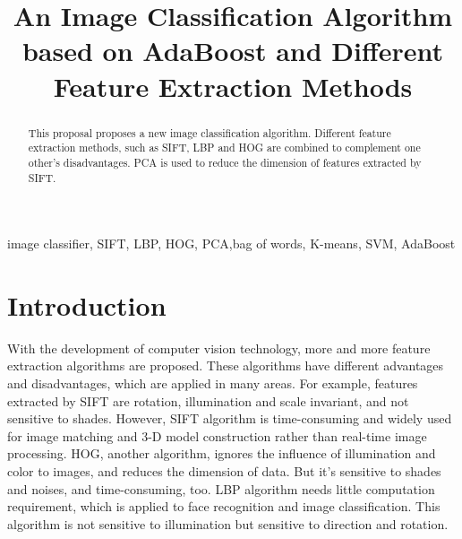\documentclass[conference]{IEEEtran}
\begin{document}
\title{An Image Classification Algorithm based on AdaBoost and Different Feature Extraction Methods\\
}

\author{
\and
{}
}

\maketitle

\begin{abstract}
This proposal proposes a new image classification algorithm. Different feature extraction methods, such as SIFT, LBP and HOG are combined to complement one other's disadvantages. PCA is used to reduce the dimension of features extracted by SIFT. 
\end{abstract}

\begin{IEEEkeywords}
image classifier, SIFT, LBP, HOG, PCA,bag of words, K-means, SVM, AdaBoost 
\end{IEEEkeywords}

\section{Introduction} With the development of computer vision technology, more and more feature extraction algorithms are proposed. These algorithms have different advantages and disadvantages, which are applied in many areas. For example, features extracted by SIFT are rotation, illumination and scale invariant, and not sensitive to shades. However, SIFT algorithm is time-consuming and widely used for image matching and 3-D model construction rather than real-time image processing. HOG, another algorithm, ignores the influence of illumination and color to images, and reduces the dimension of data. But it's sensitive to shades and noises, and time-consuming, too. LBP algorithm needs little computation requirement, which is applied to face recognition and image classification. This algorithm is not sensitive to illumination but sensitive to direction and rotation.
\end{document}
